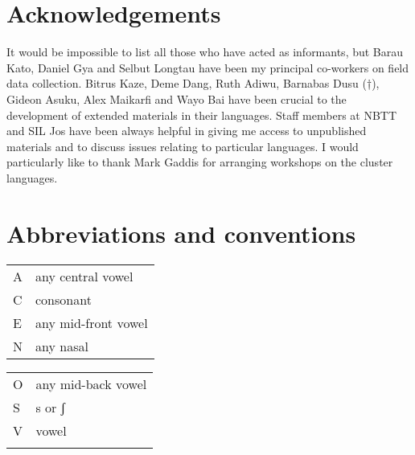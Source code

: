 \documentclass[output=paper]{langsci/langscibook}
\begin{document}
\section*{Acknowledgements} 
It would be impossible to list all those who have acted as informants, but 
Barau Kato, 
Daniel Gya and 
Selbut Longtau 
have been my principal co-workers on field data collection. 
Bitrus Kaze, 
Deme Dang, 
Ruth Adiwu,
Barnabas Dusu (†), 
Gideon Asuku, 
Alex Maikarfi and 
Wayo Bai 
have been crucial to the development of extended materials in their languages. Staff members at NBTT and SIL Jos have been always helpful in giving me access to unpublished materials and to discuss issues relating to particular languages. I would particularly like to thank Mark Gaddis for arranging workshops on the  cluster languages.
\section*{Abbreviations and conventions}

\begin{tabularx}{.45\textwidth}{lX} 
A 	& any central vowel\\
C 	& consonant\\
E 	& any mid-front vowel\\
N 	& any nasal\\
\end{tabularx}
\begin{tabularx}{.45\textwidth}{lX} 
O 	& any mid-back vowel\\
S 	& s or ʃ\\
V 	& vowel\\ 
\\
\end{tabularx}
 
\sloppy
\printbibliography[heading=subbibliography,notkeyword=this] 
\end{document}
